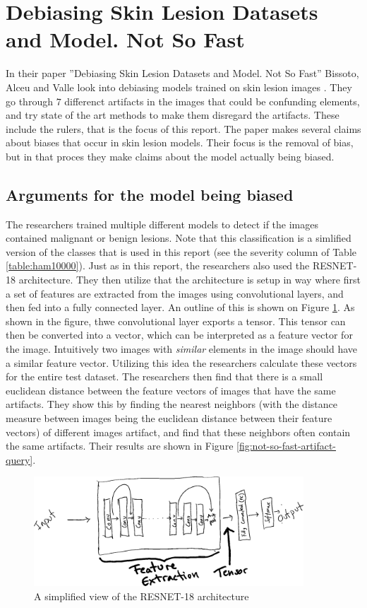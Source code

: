 \section{Debiasing Skin Lesion Datasets and Model. Not So Fast}
In their paper
''Debiasing Skin Lesion Datasets and Model. Not So Fast''
Bissoto, Alceu and Valle look into debiasing models trained on
skin lesion images \cite{debias-not-so-fast}.
They go through $7$ differenct artifacts in the images that could
be confunding elements, and try state of the art methods to
make them disregard the artifacts.
These include the rulers, that is the focus of this report.
The paper makes several claims about biases that occur in
skin lesion models.
Their focus is the removal of bias, but in that proces they
make claims about the model actually being biased.

\subsection{Arguments for the model being biased}
The researchers trained multiple different models to detect if the
images contained malignant or benign lesions.
Note that this classification is a simlified version of the classes
that is used in this report (see the severity column of Table \ref{table:ham10000}).
Just as in this report, the researchers also used the RESNET-18 architecture.
They then utilize that the architecture is setup in way where first a set of features
are extracted from the images using convolutional layers, and then fed into a fully connected layer. 
An outline of this is shown on Figure \ref{fig:resnet-outline}.
As shown in the figure, thwe convolutional layer exports a tensor.
This tensor can then be converted into a vector, which can be interpreted as a feature vector for the image.
Intuitively two images with \textit{similar} elements in the image should have a similar feature vector.
Utilizing this idea the researchers calculate these vectors for the entire test dataset.
The researchers then find that there is a small euclidean distance between the feature vectors of images
that have the same artifacts.
They show this by finding the nearest neighbors (with the distance measure between images being the euclidean distance between their feature vectors)
of different images artifact, and find that these neighbors often contain the same artifacts.
Their results are shown in Figure \ref{fig:not-so-fast-artifact-query}.


\begin{figure}[h]
    \centering
    \includegraphics[width=0.9\textwidth]{images/resnet-outline.png}
    \caption{A simplified view of the RESNET-18 architecture}
    \label{fig:resnet-outline}
\end{figure}

